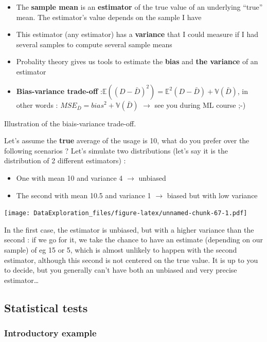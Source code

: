 \documentclass[
]{book}
\providecommand{\tightlist}{%
  \setlength{\itemsep}{0pt}\setlength{\parskip}{0pt}}
\begin{document}
\begin{itemize}
\tightlist
\item
  The \textbf{sample mean} is an \textbf{estimator} of the true value of an underlying ``true'' mean. The estimator's value depends on the sample I have
\item
  This estimator (any estimator) has a \textbf{variance} that I could measure if I had several samples to compute several sample means
\item
  Probality theory gives us tools to estimate the \textbf{bias} and \textbf{the variance} of an estimator
\item
  \textbf{Bias-variance trade-off} :\(\mathbb{E}((D-\bar{D})^2)=\mathbb{E}^2(D-\bar{D}) + \mathbb{V}(\bar{D})\), in other words : \(MSE_{\bar{D}} = bias^2 + \mathbb{V}(\bar{D})\) \(\rightarrow\) see you during ML course ;-)
\end{itemize}

Illustration of the biais-variance trade-off.

Let's assume the \textbf{true} average of the usage is 10, what do you prefer over the following scenarios ? Let's simulate two distributions (let's say it is the distribution of 2 different estimators) :

\begin{itemize}
\tightlist
\item
  One with mean 10 and variance 4 \(\rightarrow\) unbiased
\item
  The second with mean 10.5 and variance 1 \(\rightarrow\) biased but with low variance
\end{itemize}

\texttt{[image: DataExploration\_files/figure-latex/unnamed-chunk-67-1.pdf]}

In the first case, the estimator is unbiased, but with a higher variance than the second : if we go for it, we take the chance to have an estimate (depending on our sample) of eg 15 or 5, which is almost unlikely to happen with the second estimator, although this second is not centered on the true value.
It is up to you to decide, but you generally can't have both an unbiased and very precise estimator\ldots{}

\hypertarget{statistical-tests}{%
\subsection{Statistical tests}\label{statistical-tests}}

\hypertarget{introductory-example}{%
\subsubsection{Introductory example}\label{introductory-example}}
\end{document}
